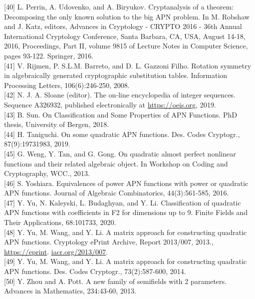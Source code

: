 \documentclass[10pt]{article}
\begin{document}
[40] L. Perrin, A. Udovenko, and A. Biryukov. Cryptanalysis of a theorem: Decomposing the only known solution to the big APN problem. In M. Robshaw and J. Katz, editors, Advances in Cryptology - CRYPTO 2016 - 36th Annual International Cryptology Conference, Santa Barbara, CA, USA, August 14-18, 2016, Proceedings, Part II, volume 9815 of Lecture Notes in Computer Science, pages 93-122. Springer, 2016.\\[0pt]
[41] V. Rijmen, P. S.L.M. Barreto, and D. L. Gazzoni Filho. Rotation symmetry in algebraically generated cryptographic substitution tables. Information Processing Letters, 106(6):246-250, 2008.\\[0pt]
[42] N. J. A. Sloane (editor). The on-line encyclopedia of integer sequences. Sequence A326932, published electronically at \href{https://oeis.org}{https://oeis.org}, 2019.\\[0pt]
[43] B. Sun. On Classification and Some Properties of APN Functions. PhD thesis, University of Bergen, 2018.\\[0pt]
[44] H. Taniguchi. On some quadratic APN functions. Des. Codes Cryptogr., 87(9):19731983, 2019.\\[0pt]
[45] G. Weng, Y. Tan, and G. Gong. On quadratic almost perfect nonlinear functions and their related algebraic object. In Workshop on Coding and Cryptography, WCC., 2013.\\[0pt]
[46] S. Yoshiara. Equivalences of power APN functions with power or quadratic APN functions. Journal of Algebraic Combinatorics, 44(3):561-585, 2016.\\[0pt]
[47] Y. Yu, N. Kaleyski, L. Budaghyan, and Y. Li. Classification of quadratic APN functions with coefficients in F2 for dimensions up to 9. Finite Fields and Their Applications, 68:101733, 2020.\\[0pt]
[48] Y. Yu, M. Wang, and Y. Li. A matrix approach for constructing quadratic APN functions. Cryptology ePrint Archive, Report 2013/007, 2013., \href{https://eprint}{https://eprint}. \href{http://iacr.org/2013/007}{iacr.org/2013/007}.\\[0pt]
[49] Y. Yu, M. Wang, and Y. Li. A matrix approach for constructing quadratic APN functions. Des. Codes Cryptogr., 73(2):587-600, 2014.\\[0pt]
[50] Y. Zhou and A. Pott. A new family of semifields with 2 parameters. Advances in Mathematics, 234:43-60, 2013.
\end{document}

